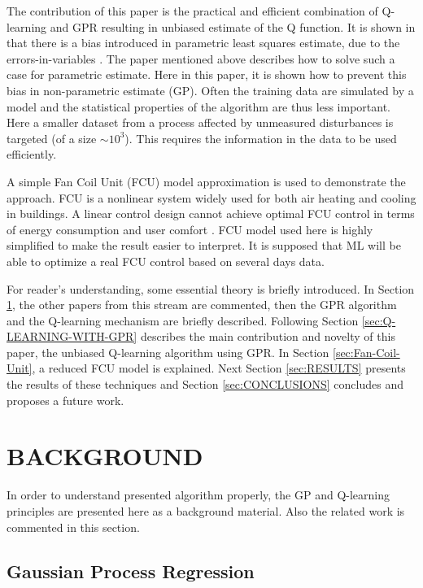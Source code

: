 \documentclass{ifacconf}
\begin{document}
The contribution of this paper is the practical and efficient combination of Q-learning and GPR resulting in unbiased estimate of the Q function. It is shown in \citep{ecc19ref:Bratke_Linear_Least_Squares_Algo} that there is a bias introduced in parametric least squares estimate, due to the errors-in-variables \citep{ecc19ref:Young_Recursive_estimation}. The paper mentioned above describes how to solve such a case for parametric estimate. Here in this paper, it is shown how to prevent this bias in non-parametric estimate (GP).
Often the training data are simulated by a model and the statistical
properties of the algorithm are thus less important. Here a smaller
dataset from a process affected by unmeasured disturbances is targeted
(of a size $\sim10^{3}$). This requires the information in the data
to be used efficiently. 

A simple Fan Coil Unit (FCU) model approximation is used to demonstrate
the approach. FCU is a nonlinear system widely used for both air heating
and cooling in buildings. A linear control design cannot achieve optimal
FCU control in terms of energy consumption and user comfort \citep{ecc19ref:Arguello_Serrano_Nonlinear_HVAC}.
FCU model used here is highly simplified to make the result easier
to interpret. It is supposed that ML will be able to optimize a real
FCU control based on several days data.

For reader's understanding, some essential theory is briefly introduced.
In Section \ref{sec:BACKGROUND}, the other papers from this stream
are commented, then the GPR algorithm and the Q-learning mechanism
are briefly described. Following Section \ref{sec:Q-LEARNING-WITH-GPR}
describes the main contribution and novelty of this paper, the unbiased
Q-learning algorithm using GPR. In Section \ref{sec:Fan-Coil-Unit},
a reduced FCU model is explained. Next Section \ref{sec:RESULTS}
presents the results of these techniques and Section \ref{sec:CONCLUSIONS}
concludes and proposes a future work. 

\section{BACKGROUND}\label{sec:BACKGROUND}

In order to understand presented algorithm properly, the GP and Q-learning
principles are presented here as a background material. Also the related
work is commented in this section.

\subsection{Gaussian Process Regression}\label{sec:gp}
\end{document}
